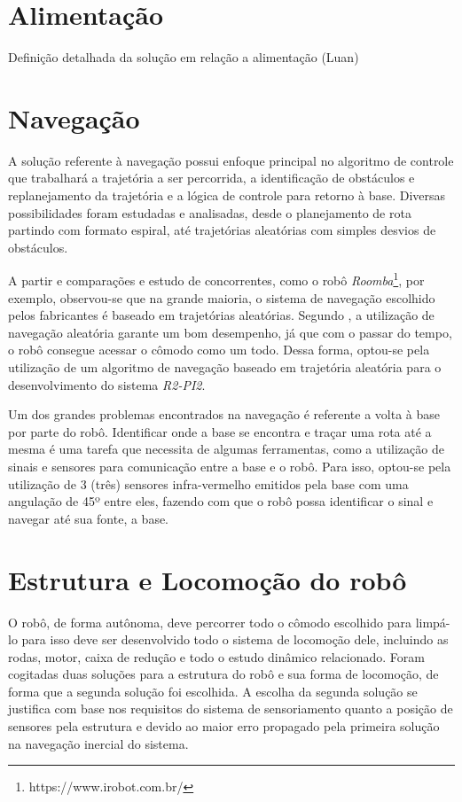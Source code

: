 \section{Alimentação} %
\label{sub:alimentação}
	Definição detalhada da solução em relação a alimentação (Luan)

\section{Navegação} %
\label{sub:automação}
	A solução referente à navegação possui enfoque principal no algoritmo de controle que trabalhará a trajetória a ser percorrida, a identificação de obstáculos e replanejamento da trajetória e a lógica de controle para retorno à base. Diversas possibilidades foram estudadas e analisadas, desde o planejamento de rota partindo com formato espiral, até trajetórias aleatórias com simples desvios de obstáculos.

	A partir e comparações e estudo de concorrentes, como o robô \textit{Roomba}\footnote{https://www.irobot.com.br/}, por exemplo, observou-se que na grande maioria, o sistema de navegação escolhido pelos fabricantes é baseado em trajetórias aleatórias. Segundo \cite{robo_limpeza_domesti}, a utilização de navegação aleatória garante um bom desempenho, já que com o passar do tempo, o robô consegue acessar o cômodo como um todo. Dessa forma, optou-se pela utilização de um algoritmo de navegação baseado em trajetória aleatória para o desenvolvimento do sistema \textit{R2-PI2}.

	Um dos grandes problemas encontrados na navegação é referente a volta à base por parte do robô. Identificar onde a base se encontra e traçar uma rota até a mesma é uma tarefa que necessita de algumas ferramentas, como a utilização de sinais e sensores para comunicação entre a base e o robô. Para isso, optou-se pela utilização de 3 (três) sensores infra-vermelho emitidos pela base com uma angulação de 45º entre eles, fazendo com que o robô possa identificar o sinal e navegar até sua fonte, a base.

\section{Estrutura e Locomoção do robô} %
\label{sub:alimentação}
	
	O robô, de forma autônoma, deve percorrer todo o cômodo escolhido para limpá-lo para isso deve ser desenvolvido todo o sistema de locomoção dele, incluindo as rodas, motor, caixa de redução e todo o estudo dinâmico relacionado. Foram cogitadas duas soluções para a estrutura do robô e sua forma de locomoção, de forma que a segunda solução foi escolhida. A escolha da segunda solução se justifica com base nos requisitos do sistema de sensoriamento quanto a posição de sensores pela estrutura e devido ao maior erro propagado pela primeira solução na navegação inercial do sistema. 

